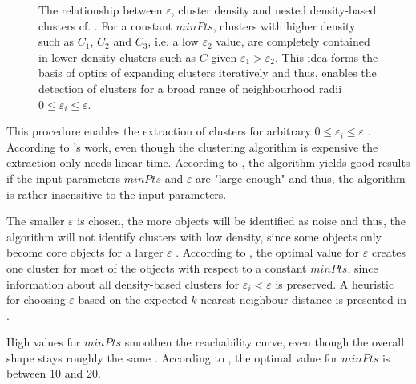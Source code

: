 \begin{figure}[htp] %
    \centering
    
    \caption[Relationship between $\varepsilon$, cluster density and nested density-based clusters]
    {The relationship between $\varepsilon$, cluster density and nested density-based clusters cf. \cite{OPTICS1999}.
    For a constant $minPts$, clusters with higher density such as $C_1$, $C_2$ and $C_3$, i.e. a low $\varepsilon_2$ value, 
    are completely contained in lower density clusters such as $C$ given $\varepsilon_1 > \varepsilon_2$.
    This idea forms the basis of \ac{optics} of expanding clusters iteratively and thus, 
    enables the detection of clusters for a broad range of neighbourhood radii $0 \le \varepsilon_i \le \varepsilon$.
    }
    \label{fig:nested_density_cluster}
\end{figure}

This procedure enables the extraction of clusters for arbitrary $0 \le \varepsilon_i \le \varepsilon$ \cite{OPTICS_kMeans_2016, OPTICS1999}.
According to \citeauthor{OPTICS2013}'s work, even though the clustering algorithm is expensive the extraction only needs linear time.
According to \cite{OPTICS1999}, the algorithm yields good results if the input parameters $minPts$ and $\varepsilon$ are "large enough" and thus, the algorithm is rather insensitive to the input parameters.

The smaller $\varepsilon$ is chosen, the more objects will be identified as noise and thus, the algorithm will not identify clusters with low density, 
since some objects only become core objects for a larger $\varepsilon$ \cite{OPTICS1999}.
According to \citeauthor{OPTICS1999}, the optimal value for $\varepsilon$ creates one cluster for most of the objects with respect to a constant $minPts$,
since information about all density-based clusters for $\varepsilon_i < \varepsilon$ is preserved.
A heuristic for choosing $\varepsilon$ based on the expected $k$-nearest neighbour distance is presented in \cite{OPTICS1999}.

High values for $minPts$ smoothen the reachability curve, even though the overall shape stays roughly the same \cite{OPTICS1999}.
According to \citeauthor{OPTICS1999}, the optimal value for $minPts$ is between 10 and 20.